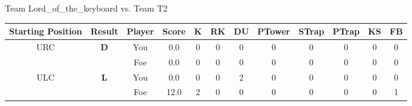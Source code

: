 \documentclass[a4paper,12pt]{article}
\begin{document}
  \vspace*{2em}
  \par {\large {\color{Gray} Team} Lord\_of\_the\_keyboard {\color{Gray}
      vs. Team} T2}
  \newline
  \begin{tabular}[t]{| c | c | c | c | c | c | c | c | c | c | c | c
      |}
    \hline
    Starting Position & \textbf{Result} & Player & \textbf{Score} & K & RK & DU & PTower & STrap & PTrap & KS & FB \\
    
      
                      
      
                      
      
                      
      
                      
      
        \hline
        \multirow{2}{*}{  URC
             } &
              \multirow{2}{*}{  
                  \textbf{D}  } & 
                    \cellcolor{yellow!25} You & \cellcolor{yellow!25} 0.0 & \cellcolor{yellow!25} 0 &
                    \cellcolor{yellow!25} 0 & \cellcolor{yellow!25} 0 & \cellcolor{yellow!25} 0 &
                    \cellcolor{yellow!25} 0 & \cellcolor{yellow!25} 0 & \cellcolor{yellow!25} 0 &
                    \cellcolor{yellow!25} 0 \\
                    \cline{3-12}
                    & & \cellcolor{red!15} Foe & \cellcolor{red!15} 0.0 & \cellcolor{red!15} 0 & \cellcolor{red!15}
                    0 & \cellcolor{red!15} 0
                    & \cellcolor{red!15} 0 & \cellcolor{red!15}
                    0 & \cellcolor{red!15} 0 
                    & \cellcolor{red!15} 0 & \cellcolor{red!15}
                    0 \\
                    
                      
      
                      
      
                      
      
                      
      
                      
      
                      
      
                      
      
        \hline
        \multirow{2}{*}{  ULC  } &
              \multirow{2}{*}{  \textbf{L}  } & 
                    \cellcolor{yellow!25} You & \cellcolor{yellow!25} 0.0 & \cellcolor{yellow!25} 0 &
                    \cellcolor{yellow!25} 0 & \cellcolor{yellow!25} 2 & \cellcolor{yellow!25} 0 &
                    \cellcolor{yellow!25} 0 & \cellcolor{yellow!25} 0 & \cellcolor{yellow!25} 0 &
                    \cellcolor{yellow!25} 0 \\
                    \cline{3-12}
                    & & \cellcolor{red!15} Foe & \cellcolor{red!15} 12.0 & \cellcolor{red!15} 2 & \cellcolor{red!15}
                    0 & \cellcolor{red!15} 0
                    & \cellcolor{red!15} 0 & \cellcolor{red!15}
                    0 & \cellcolor{red!15} 0 
                    & \cellcolor{red!15} 0 & \cellcolor{red!15}
                    1 \\
                    

\end{tabular}
\end{document}
